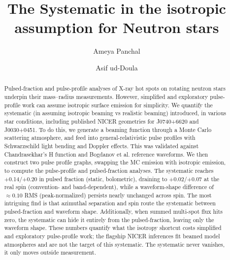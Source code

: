 \documentclass[twocolumn]{aastex701}
\begin{document}
\title{The Systematic in the isotropic assumption for Neutron stars}

\author{Ameya Panchal}

\author{Asif ud-Doula}


\begin{abstract}
Pulsed-fraction and pulse-profile analyses of X-ray hot spots on rotating neutron stars
underpin their mass--radius measurements. However, simplified and exploratory pulse-profile
work can assume isotropic surface emission for simplicity.
We quantify the systematic (in assuming isotropic beaming vs realistic beaming) introduced,
in various star conditions, including published NICER geometries for J0740+6620 and
J0030+0451. 
To do this, we generate a beaming function through a Monte Carlo scattering atmosphere, and
feed into general-relativistic pulse profiles with Schwarzschild light bending and Doppler
effects. 
This was validated against Chandrasekhar's H function and Bogdanov et al. reference
waveforms. We then construct two pulse profile graphs, swapping the MC emission with
isotropic emission, to compute the pulse-profile and pulsed-fraction analyses. 
The systematic reaches +0.14/+0.20 in pulsed fraction (static, bolometric), draining to
+0.02/+0.07 at the real spin (convention- and band-dependent), while a waveform-shape difference of
$\approx 0.10$ RMS (peak-normalized) persists nearly unchanged across spin. The most
intriguing find is that azimuthal separation and spin route the systematic between
pulsed-fraction and waveform shape.
Additionally, when summed multi-spot flux hits zero, the systematic can hide it entirely
from the pulsed-fraction, leaving only the waveform shape.
These numbers quantify what the isotropy shortcut costs simplified and exploratory
pulse-profile work; the flagship NICER inferences fit beamed model atmospheres and are not
the target of this systematic. The systematic never vanishes, it only moves outside
measurement.
\end{abstract}
\end{document}
